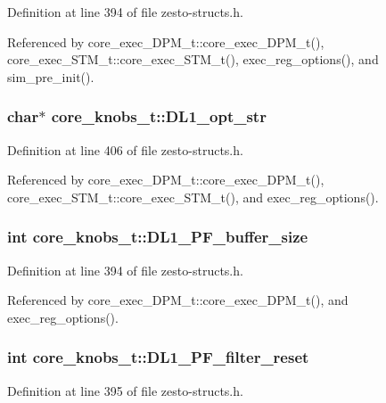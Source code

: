 Definition at line 394 of file zesto-structs.h.

Referenced by core\_\-exec\_\-DPM\_\-t::core\_\-exec\_\-DPM\_\-t(), core\_\-exec\_\-STM\_\-t::core\_\-exec\_\-STM\_\-t(), exec\_\-reg\_\-options(), and sim\_\-pre\_\-init().
\subsubsection[{DL1\_\-opt\_\-str}]{\setlength{\rightskip}{0pt plus 5cm}char$\ast$ {\bf core\_\-knobs\_\-t::DL1\_\-opt\_\-str}}\label{structcore__knobs__t_6bba6cdbf4da0735e0d2fcb62abd267a}




Definition at line 406 of file zesto-structs.h.

Referenced by core\_\-exec\_\-DPM\_\-t::core\_\-exec\_\-DPM\_\-t(), core\_\-exec\_\-STM\_\-t::core\_\-exec\_\-STM\_\-t(), and exec\_\-reg\_\-options().
\subsubsection[{DL1\_\-PF\_\-buffer\_\-size}]{\setlength{\rightskip}{0pt plus 5cm}int {\bf core\_\-knobs\_\-t::DL1\_\-PF\_\-buffer\_\-size}}\label{structcore__knobs__t_a69d601f13eb0da6ccd2f71a1fe75386}




Definition at line 394 of file zesto-structs.h.

Referenced by core\_\-exec\_\-DPM\_\-t::core\_\-exec\_\-DPM\_\-t(), and exec\_\-reg\_\-options().
\subsubsection[{DL1\_\-PF\_\-filter\_\-reset}]{\setlength{\rightskip}{0pt plus 5cm}int {\bf core\_\-knobs\_\-t::DL1\_\-PF\_\-filter\_\-reset}}\label{structcore__knobs__t_33cea2b9906773001218a0f31f78190b}




Definition at line 395 of file zesto-structs.h.

